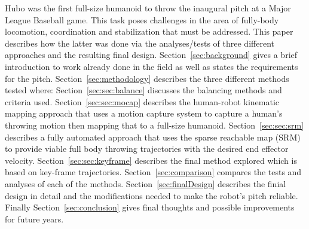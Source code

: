 Hubo was the first full-size humanoid to throw the inaugural pitch at a Major League Baseball game.  
This task poses challenges in the area of fully-body locomotion, coordination and stabilization that must be addressed.
This paper describes how the latter was done via the analyses/tests of three different approaches and the resulting final design.
Section~\ref{sec:background} gives a brief introduction to work already done in the field as well as states the requirements for the pitch.
Section~\ref{sec:methodology} describes the three different methods tested where:
Section~\ref{sec:sec:balance} discusses the balancing methods and criteria used.
Section~\ref{sec:sec:mocap} describes the human-robot kinematic mapping approach that uses a motion capture system to capture a human's throwing motion then mapping that to a full-size humanoid.  
Section~\ref{sec:sec:srm} describes a fully automated approach that uses the sparse reachable map (SRM) to provide viable full body throwing trajectories with the desired end effector velocity\cite{dlofaro-srm}.
Section~\ref{sec:sec:keyframe} describes the final method explored which is based on key-frame trajectories.
Section~\ref{sec:comparison} compares the tests and analyses of each of the methods.
Section~\ref{sec:finalDesign} describes the finial design in detail and the modifications needed to make the robot's pitch reliable.
Finally Section~\ref{sec:conclusion} gives final thoughts and possible improvements for future years.



